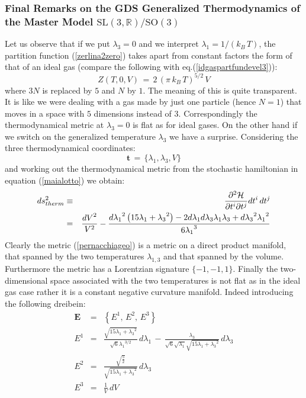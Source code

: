 \documentclass[10pt,a4paper]{article}
\begin{document}
 \subsubsection{Final Remarks on the GDS Generalized Thermodynamics of the Master Model $\mathrm{SL(3,\mathbb{R})/SO(3)}$}
 Let us observe that if we put $\lambda_3=0$ and we interpret $\lambda_1=1/(k_B\, T)$, the partition function
 (\ref{zerlina2zero})  takes apart from constant factors  the form of that of an ideal gas (compare the following with eq.(\ref{idgaspartfundevel3})):
  \begin{equation}\label{kastriula}
    Z(T,0,V) \, = \,2 \,(\pi \,k_B \, T)^{5/2} \, V
  \end{equation}
 where $3N$ is replaced by $5$ and $N$ by $1$. The meaning of this is quite transparent. It is like we were dealing with a gas made by just one particle (hence $N=1$) that moves in a space with $5$ dimensions instead of $3$. Correspondingly the thermodynamical metric at $\lambda_3=0$ is flat as for ideal gases. On the other hand if we switch on the generalized temperature $\lambda_3$ we have a surprise. Considering the three thermodynamical coordinates:
 \begin{equation}\label{tcord}
   \mathbf{t}\, = \, \{\lambda_1,\lambda_3,V\}
 \end{equation}
 and working out the thermodynamical metric from the stochastic hamiltonian in equation (\ref{maialotto}) we obtain:
 \begin{eqnarray}
 \label{pernacchiageo}
   ds^2_{therm} &\equiv& \frac{\partial^2 \mathcal{H}}{\partial t^i \partial t^j} dt^i \, dt^j \nonumber \\
   \null &=& \frac{ {dV}^2}{V^2}-\frac{ {d \lambda_  1}^2 \left(15  { \lambda_
    1}+ { \lambda_  3}^2\right)-2  {d \lambda_  1}  {d \lambda_  3}
    { \lambda_  1}  { \lambda_  3}+ {d \lambda_  3}^2  { \lambda_  1}^2}{6
    { \lambda_  1}^3}
 \end{eqnarray}
Clearly the metric (\ref{pernacchiageo}) is a metric on a direct product manifold, that spanned by the two temperatures $\lambda_{1,3}$ and that spanned by the volume. Furthermore the metric has a Lorentzian signature
$\{-1,-1,1\}$. Finally the two-dimensional space associated with the two temperatures is not flat as in the ideal gas case rather it is a constant negative curvature manifold. Indeed introducing the following dreibein:
\begin{eqnarray}\label{ciromania}
  \mathbf{E}& = & \left\{E^1,\, E^2, \, E^3 \right\}\nonumber\\
  E^1& = & \frac{  \sqrt{15  { \lambda_  1}+ { \lambda_  3}^2}}{\sqrt{6}
    { \lambda_  1}^{3/2}}\, {d \lambda_  1} \, -\, \frac{  { \lambda_  3}}{\sqrt{6}
   \sqrt{ { \lambda_  1}} \sqrt{15  { \lambda_  1}+ { \lambda_  3}^2}}\, {d \lambda_  3} \nonumber\\
   E^2 & = & \frac{\sqrt{\frac{5}{2}}  }{\sqrt{15  { \lambda_
    1}+ { \lambda_  3}^2}}\, {d \lambda_  3} \nonumber\\
   E^3 & = & \frac{1 }{V}\, {dV}
\end{eqnarray}
\end{document}
